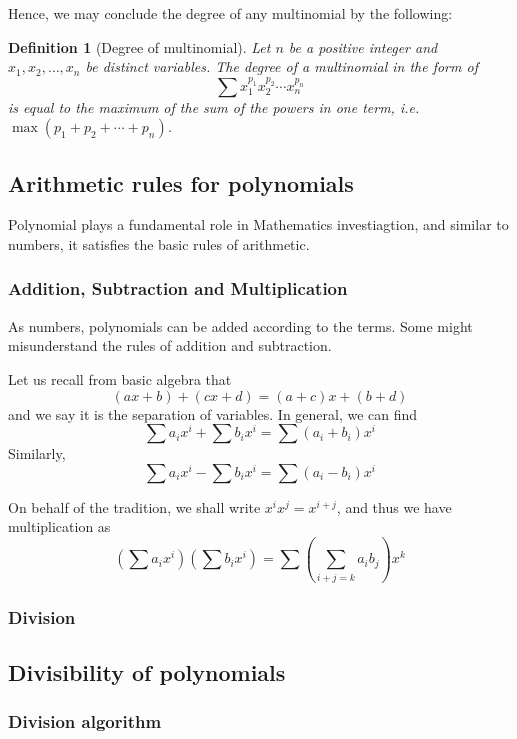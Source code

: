 \documentclass[12pt]{article}
\newtheorem{definition}{Definition}[section]
\begin{document}
    Hence, we may conclude the degree of any multinomial by the following:

    \begin{definition}[Degree of multinomial]
        Let $n$ be a positive integer and $x_1,x_2,\dots,x_n$ be distinct variables. The degree of a multinomial in the form of \[\sum x_1^{p_1} x_2^{p_2}\cdots x_n^{p_n}\] is equal to the maximum of the sum of the powers in one term, i.e. $\max(p_1+p_2+\cdots+p_n)$.
    \end{definition}

    \subsection{Arithmetic rules for polynomials}

    Polynomial plays a fundamental role in Mathematics investiagtion, and similar to numbers, it satisfies the basic rules of arithmetic.

    \subsubsection*{Addition, Subtraction and Multiplication}

    As numbers, polynomials can be added according to the terms. Some might misunderstand the rules of addition and subtraction.

    Let us recall from basic algebra that \[(ax+b)+(cx+d)=(a+c)x+(b+d)\] and we say it is the separation of variables. In general, we can find \[\sum a_i x^i + \sum b_i x^i = \sum (a_i + b_i) x^i\] Similarly, \[\sum a_i x^i - \sum b_i x^i = \sum (a_i - b_i) x^i\]

    On behalf of the tradition, we shall write $x^i x^j = x^{i+j}$, and thus we have multiplication as \[(\sum a_i x^i)(\sum b_i x^i) = \sum (\sum_{i+j=k} a_i b_j) x^k\]

    \subsubsection*{Division}

    \subsection{Divisibility of polynomials}

    \subsubsection*{Division algorithm}
\end{document}
